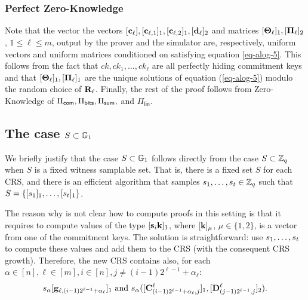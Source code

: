 \subsubsection{Perfect Zero-Knowledge}
Note that the vector the vectors \([\mathbf{c}_\ell],[\mathbf{c}_{\ell,1}]_1,[\mathbf{c}_{\ell,2}]_1,[\mathbf{d}_\ell]_2\) and matrices \([\mathbf{{\Theta}}_\ell]_1,[\mathbf{{\Pi}}_\ell]_2\), \(1\leq\ell\leq m\), output by the prover and the simulator are, respectively, uniform vectors and uniform matrices conditioned on satisfying equation \ref{eq-alog-5}. This follows from the fact that \(ck,ck_1,\ldots,ck_\ell\) are all perfectly hiding commitment keys and that \([\mathbf{{\Theta}}_\ell]_1,[\mathbf{{\Pi}}_\ell]_1\) are the unique solutions of equation (\ref{eq-alog-5}) modulo the random choice of \(\mathbf{{R}}_\ell\). Finally, the rest of the proof follows from Zero-Knowledge of \(\Pi_{\mathsf{com}},\Pi_{\mathsf{bits}},\Pi_{\mathsf{sum}},\) and \(\Pi_\mathsf{lin}\).

\subsection{The case \(S\subset\mathbb{G}_1\)} \label{sec:improved-aZKSMP-group-case}
We briefly justify that the case \(S\subset\mathbb{G}_1\) follows directly from the case \(S\subset\mathbb{Z}_q\) when \(S\) is a fixed witness samplable set. That is, there is a fixed set $S$ for each CRS, and there is an efficient algorithm that samples \(s_1,\ldots,s_{t }\in\mathbb{Z}_q\) such that \(S=\{[s_1]_1,\ldots,[s_{t }]_1\}\). %

The reason why is not clear how to compute proofs in this setting is that it requires to compute values of the type \([\mathbf{s}_i\mathbf{k}]_1\), where \([\mathbf{k}]_\mu\), \(\mu\in\{1,2\}\), is a vector from one of the commitment keys. The solution is straightforward: use \(s_1,\ldots,s_{t }\) to compute these values and add them to the CRS (with the consequent CRS growth). Therefore, the new CRS contains also, for each $\alpha\in[n],\ell\in[m],i\in[n],j\neq(i-1)2^{\ell-1}+\alpha_\ell$:
\begin{align*}
s_\alpha[\mathbf{g}_{\ell,(i-1)2^{\ell-1}+\alpha_\ell}]_1 \text{ and }
 s_\alpha([\mathbf{{C}}^\ell_{(i-1)2^{\ell-1}+\alpha_\ell,j}]_1,[\mathbf{{D}}_{(j-1)2^{\ell-1},j}^\ell]_2).
\end{align*}


